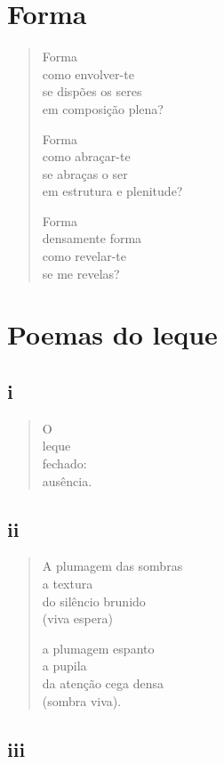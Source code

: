 \chapter{Forma}

\begin{verse}
Forma\\
como envolver-te\\
se dispões os seres\\
em composição plena?

Forma\\
como abraçar-te\\
se abraças o ser\\
em estrutura e plenitude?

Forma\\
densamente forma\\
como revelar-te\\
se me revelas?
\end{verse}

\chapter{Poemas do leque}

\section{i}

\begin{verse}
O\\
leque\\
fechado:\\
ausência.
\end{verse}

\medskip
\section{ii}

\begin{verse}
A plumagem das sombras\\
a textura\\
do silêncio brunido\\
(viva espera)

a plumagem espanto\\
a pupila\\
da atenção cega densa\\
(sombra
\quad\quad{}viva).
\end{verse}

\medskip
\section{iii}

